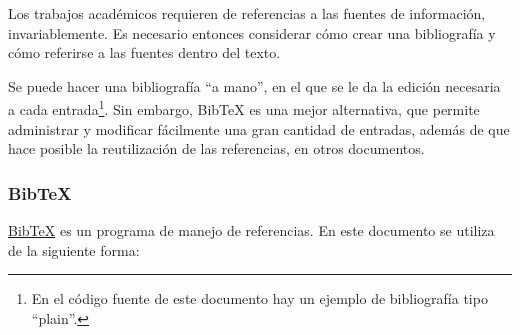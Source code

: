 \documentclass[12pt,letterpaper]{article}
\begin{document}
Los trabajos académicos requieren de referencias a las fuentes de información, invariablemente. Es necesario entonces considerar cómo crear una bibliografía y cómo referirse a las fuentes dentro del texto. 

Se puede hacer una bibliografía ``a mano'', en el que se le da la edición necesaria a cada entrada\footnote{En el código fuente de este documento hay un ejemplo de bibliografía tipo ``plain''.}. Sin embargo, BibTeX es una mejor alternativa, que permite administrar y modificar fácilmente una gran cantidad de entradas, además de que hace posible la reutilización de las referencias, en otros documentos.

\subsubsection{BibTeX}

\href{http://www.bibtex.org/}{BibTeX} es un programa de manejo de referencias. En este documento se utiliza de la siguiente forma:
\end{document}
